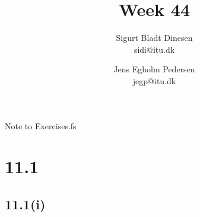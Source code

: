 \documentclass[a4paper, titlepage]{article}
\begin{document}
\title{Week 44}
\author{Sigurt Bladt Dinesen \\sidi{@}itu.dk 
  \and Jens Egholm Pedersen \\jegp{@}itu.dk}
\maketitle

Note to  Exercises.fs
\section*{11.1}
\subsection*{11.1(i)}
\end{document}
